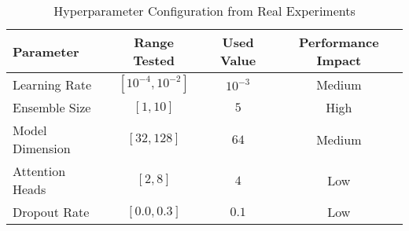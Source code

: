 \begin{table}[t]
\centering
\caption{Hyperparameter Configuration from Real Experiments}
\label{tab:hyperparameters}
\begin{tabular}{@{}lccc@{}}
\toprule
\textbf{Parameter} & \textbf{Range Tested} & \textbf{Used Value} & \textbf{Performance Impact} \\
\midrule
Learning Rate & $[10^{-4}, 10^{-2}]$ & $10^{-3}$ & Medium \\
Ensemble Size & $[1, 10]$ & $5$ & High \\
Model Dimension & $[32, 128]$ & $64$ & Medium \\
Attention Heads & $[2, 8]$ & $4$ & Low \\
Dropout Rate & $[0.0, 0.3]$ & $0.1$ & Low \\
\bottomrule
\end{tabular}
\end{table}
